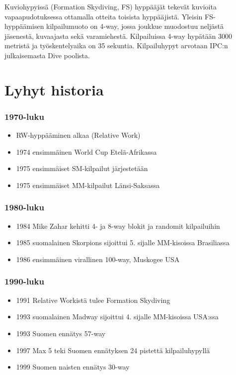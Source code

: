 
Kuviohypyissä (Formation Skydiving, FS) hyppääjät tekevät kuvioita vapaapudotuksessa ottamalla otteita toisista hyppääjistä. Yleisin FS-hyppäämisen kilpailumuoto on 4-way, jossa joukkue muodostuu neljästä jäsenestä, kuvaajasta sekä varamiehestä. Kilpailuissa 4-way hypätään 3000 metristä ja työskentelyaika on 35 sekuntia. Kilpailuhypyt arvotaan IPC:n julkaisemasta Dive poolista. 

\section{ Lyhyt historia }
\label{yleista-fs-hyppaamisesta-lyhyt-historia}

\subsubsection{ 1970-luku }
\label{yleista-fs-hyppaamisesta-1970-luku}

\begin{itemize}
\item  RW-hyppääminen alkaa (Relative Work)  
\item  1974 ensimmäinen World Cup Etelä-Afrikassa  
\item  1975 ensimmäiset SM-kilpailut järjestetään  
\item  1975 ensimmäiset MM-kilpailut Länsi-Saksassa  
\end{itemize}
\subsubsection{ 1980-luku }
\label{yleista-fs-hyppaamisesta-1980-luku}

\begin{itemize}
\item  1984 Mike Zahar kehitti 4- ja 8-way blokit ja randomit kilpailuihin  
\item  1985 suomalainen Skorpions sijoittui 5. sijalle MM-kisoissa Brasiliassa  
\item  1986 ensimmäinen virallinen 100-way, Muskogee USA  
\end{itemize}
\subsubsection{ 1990-luku }
\label{yleista-fs-hyppaamisesta-1990-luku}

\begin{itemize}
\item  1991 Relative Workistä tulee Formation Skydiving  
\item  1993 suomalainen Madway sijoittui 4. sijalle MM-kisoissa USA:ssa  
\item  1993 Suomen ennätys 57-way  
\item  1997 Max 5 teki Suomen ennätyksen 24 pistettä kilpailuhypyllä  
\item  1999 Suomen naisten ennätys 30-way  
\end{itemize}
